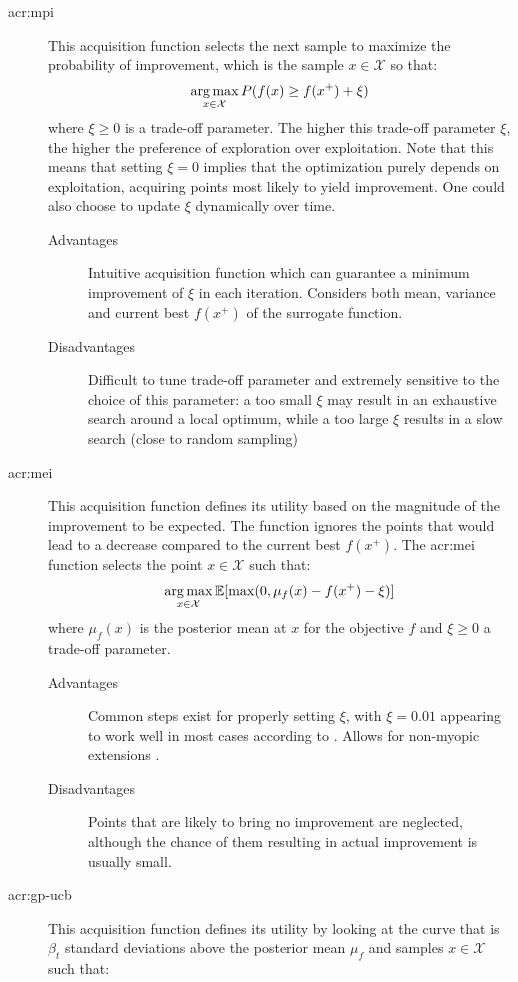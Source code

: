 \begin{description}
	\item[\acrfull{acr:mpi}] This acquisition function selects the next sample to maximize the probability of improvement, which is the sample $x \in \mathcal{X}$ so that:
	$$\operatorname*{arg\,max}_{x \in \mathcal{X}} P(f(x) \geq f(x^+) + \xi)$$
	where $\xi \geq 0$ is a trade-off parameter. The higher this trade-off parameter $\xi$, the higher the preference of exploration over exploitation. Note that this means that setting $\xi = 0$ implies that the optimization purely depends on exploitation, acquiring points most likely to yield improvement. One could also choose to update $\xi$ dynamically over time.
	\begin{description}
		\item[Advantages] Intuitive acquisition function which can guarantee a minimum improvement of $\xi$ in each iteration. Considers both mean, variance and current best $f(x^+)$ of the surrogate function.
		\item[Disadvantages] Difficult to tune trade-off parameter and extremely sensitive to the choice of this parameter: a too small $\xi$ may result in an exhaustive search around a local optimum, while a too large $\xi$ results in a slow search (close to random sampling)
	\end{description}
	\item[\acrfull{acr:mei}] This acquisition function defines its utility based on the magnitude of the improvement to be expected. The function ignores the points that would lead to a decrease compared to the current best $f(x^+)$. The \acrshort{acr:mei} function selects the point $x \in \mathcal{X}$ such that:
	$$\operatorname*{arg\,max}_{x \in \mathcal{X}} \mathbb{E}[\max(0, \mu_f(x) - f(x^+) - \xi)]$$
	where $\mu_f(x)$ is the posterior mean at $x$ for the objective $f$ and $\xi \geq 0$ a trade-off parameter.
	\begin{description}
		\item[Advantages] Common steps exist for properly setting $\xi$, with $\xi = 0.01$ appearing to work well in most cases according to \cite{lizotte2008practical}. Allows for non-myopic extensions \cite{Brochu2010}.
		\item[Disadvantages] Points that are likely to bring no improvement are neglected, although the chance of them resulting in actual improvement is usually small.
	\end{description}
	\item[\acrfull{acr:gp-ucb}] This acquisition function defines its utility by looking at the curve that is $\beta_t$ standard deviations above the posterior mean $\mu_f$ and samples $x \in \mathcal{X}$ such that:

\end{description}
